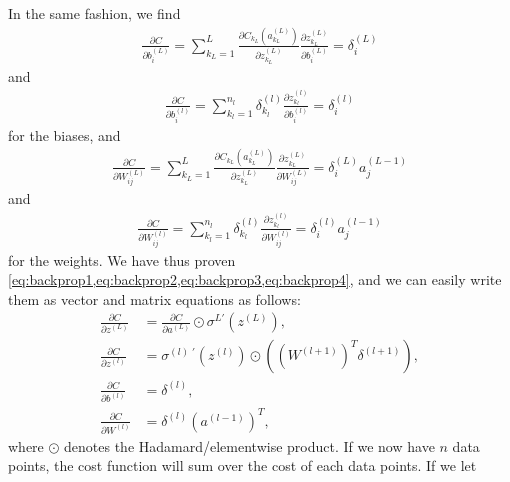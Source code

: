 In the same fashion, we find
\begin{align*}
    \frac{\partial C}{\partial b^{(L)}_i}=\sum_{k_L=1}^L\frac{\partial C_{k_L}(a^{(L)}_{k_L})}{\partial z^{(L)}_{k_L}}\frac{\partial z^{(L)}_{k_L}}{\partial b^{(L)}_i}=\delta^{(L)}_i
\end{align*}
and
\begin{align*}
    \frac{\partial C}{\partial b^{(l)}_i}=\sum_{k_l=1}^{n_l}\delta^{(l)}_{k_l}\frac{\partial z^{(l)}_{k_l}}{\partial b^{(l)}_i}=\delta^{(l)}_i
\end{align*}
for the biases, and
\begin{align*}
    \frac{\partial C}{\partial W^{(L)}_{ij}}=\sum_{k_L=1}^L\frac{\partial C_{k_L}(a^{(L)}_{k_L})}{\partial z^{(L)}_{k_L}}\frac{\partial z^{(L)}_{k_L}}{\partial W^{(L)}_{ij}}=\delta^{(L)}_ia^{(L-1)}_j
\end{align*}
and
\begin{align*}
    \frac{\partial C}{\partial W^{(l)}_{ij}}=\sum_{k_l=1}^{n_l}\delta^{(l)}_{k_l}\frac{\partial z^{(l)}_{k_l}}{\partial W^{(l)}_{ij}}=\delta^{(l)}_ia^{(l-1)}_j
\end{align*}
for the weights. We have thus proven \cref{eq:backprop1,eq:backprop2,eq:backprop3,eq:backprop4}, and we can easily write them as vector and matrix equations as follows:
\begin{align*}
    \frac{\partial C}{\partial z^{(L)}} &= \frac{\partial C}{\partial a^{(L)}}\odot\sigma^{L\prime}(z^{(L)}),
    \\
    \frac{\partial C}{\partial z^{(l)}} &= \sigma^{(l)\;\prime}(z^{(l)})\odot((W^{(l+1)})^T\delta^{(l+1)}),
    \\
    \frac{\partial C}{\partial b^{(l)}} &= \delta^{(l)},
    \\
    \frac{\partial C}{\partial W^{(l)}} &= \delta^{(l)}(a^{(l-1)})^T,
\end{align*}
where \(\odot\) denotes the Hadamard/elementwise product. If we now have \(n\) data points, the cost function will sum over the cost of each data points. If we let
